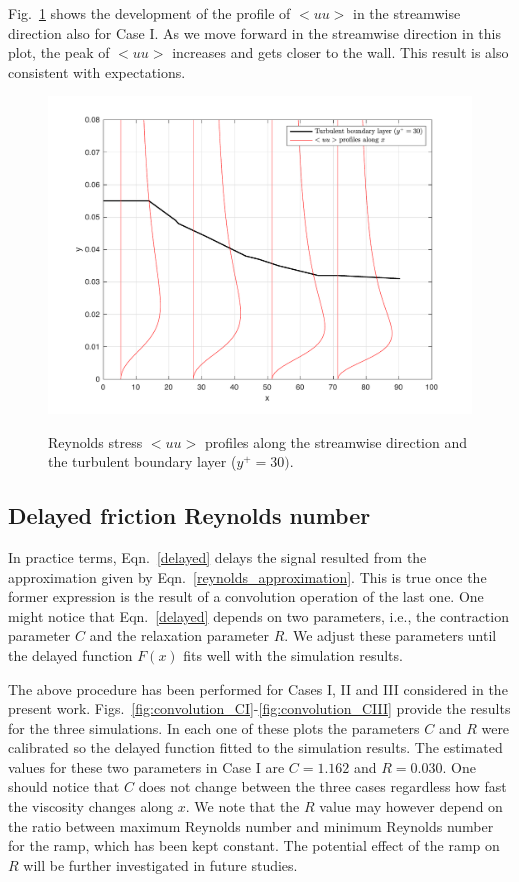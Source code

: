 \documentclass[twocolumn,10pt]{asme2e}
\begin{document}
Fig.~\ref{fig:uu_CI} shows the development of the profile of \(<uu>\) in the streamwise direction also for Case I. As we move forward in the streamwise direction in this plot, the peak of \(<uu>\) increases and gets closer to the wall. This result is also consistent with expectations.

\begin{figure}[t]
\centering
\scalebox{0.5}
{\includegraphics{uu_CI.pdf}}
\caption{Reynolds stress \(<uu>\) profiles along the streamwise direction and the turbulent boundary layer (\(y^+=30)\).}
\label{fig:uu_CI}
\end{figure}

\subsection*{Delayed friction Reynolds number}

In practice terms, Eqn.~\ref{delayed} delays the signal resulted from the approximation given by Eqn.~\ref{reynolds_approximation}. This is true once the former expression is the result of a convolution operation of the last one. One might notice that Eqn.~\ref{delayed} depends on two parameters, i.e., the contraction parameter \(C\) and the relaxation parameter \(R\). We adjust these parameters until the delayed function \(F(x)\) fits well with the simulation results.

The above procedure has been performed for Cases I, II and III considered in the present work. Figs.~\ref{fig:convolution_CI}-\ref{fig:convolution_CIII} provide the results for the three simulations. In each one of these plots the parameters \(C\) and \(R\) were calibrated so the delayed function fitted to the simulation results. The estimated values for these two parameters in Case I are \(C=1.162\) and \(R=0.030\). One should notice that \(C\) does not change between the three cases regardless how fast the viscosity changes along \(x\). We note that the \(R\) value may however depend on the ratio between maximum Reynolds number and minimum Reynolds number for the ramp, which has been kept constant. The potential effect of the ramp on \(R\) will be further investigated in future studies.
\end{document}
